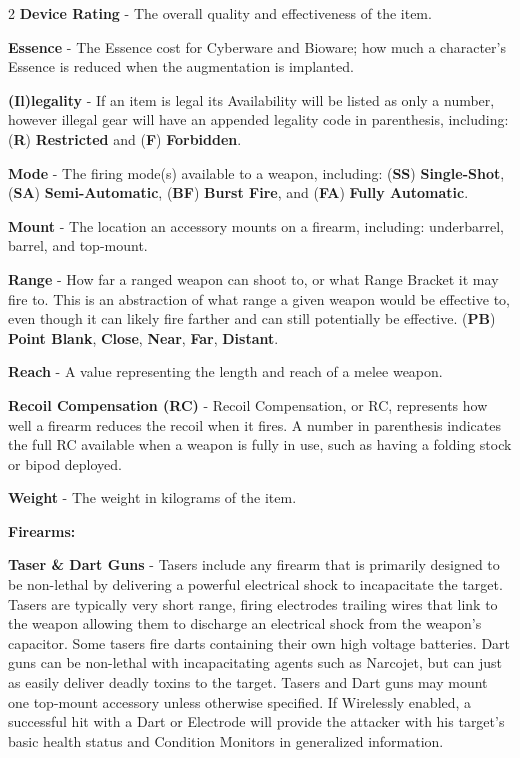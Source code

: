 \documentclass[
  oneside]{article}
\begin{document}
\begin{multicols}{2}
\textbf{Device Rating} - The overall quality and
effectiveness of the item.

\textbf{Essence} - The Essence cost for Cyberware
and Bioware; how much a character's Essence is
reduced when the augmentation is implanted.

\textbf{(Il)legality} - If an item is legal its
Availability will be listed as only a number,
however illegal gear will have an appended
legality code in parenthesis, including:
(\textbf{R}) \textbf{Restricted} and (\textbf{F})
\textbf{Forbidden}.

\textbf{Mode} - The firing mode(s) available to a
weapon, including: (\textbf{SS})
\textbf{Single-Shot}, (\textbf{SA})
\textbf{Semi-Automatic}, (\textbf{BF})
\textbf{Burst Fire}, and (\textbf{FA})
\textbf{Fully Automatic}.

\textbf{Mount} - The location an accessory mounts
on a firearm, including: underbarrel, barrel, and
top-mount.

\textbf{Range} - How far a ranged weapon can shoot
to, or what Range Bracket it may fire to. This is
an abstraction of what range a given weapon would
be effective to, even though it can likely fire
farther and can still potentially be effective.
(\textbf{PB}) \textbf{Point Blank},
\textbf{Close}, \textbf{Near}, \textbf{Far},
\textbf{Distant}.

\textbf{Reach} - A value representing the length
and reach of a melee weapon.

\textbf{Recoil Compensation (RC)} - Recoil
Compensation, or RC, represents how well a firearm
reduces the recoil when it fires. A number in
parenthesis indicates the full RC available when a
weapon is fully in use, such as having a folding
stock or bipod deployed.

\textbf{Weight} - The weight in kilograms of the
item.

\textbf{Firearms:}

\textbf{Taser \& Dart Guns} - Tasers include any
firearm that is primarily designed to be
non-lethal by delivering a powerful electrical
shock to incapacitate the target. Tasers are
typically very short range, firing electrodes
trailing wires that link to the weapon allowing
them to discharge an electrical shock from the
weapon's capacitor. Some tasers fire darts
containing their own high voltage batteries. Dart
guns can be non-lethal with incapacitating agents
such as Narcojet, but can just as easily deliver
deadly toxins to the target. Tasers and Dart guns
may mount one top-mount accessory unless otherwise
specified. If Wirelessly enabled, a successful hit
with a Dart or Electrode will provide the attacker
with his target's basic health status and
Condition Monitors in generalized information.


\end{multicols}
\end{document}
